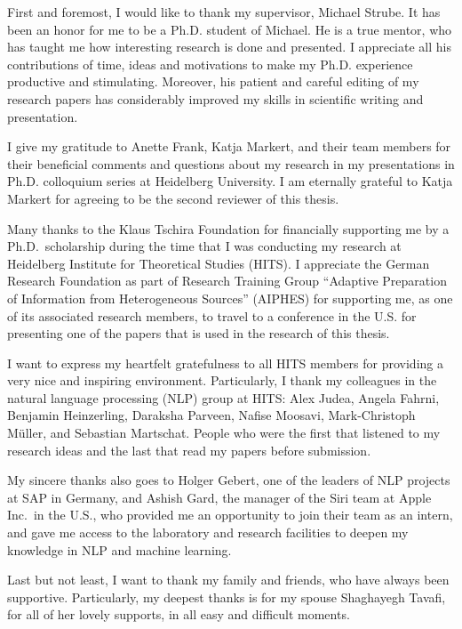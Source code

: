 
First and foremost, I would like to thank my supervisor, Michael Strube. 
It has been an honor for me to be a Ph.D. student of Michael. 
He is a true mentor, who has taught me how interesting research is done and presented. 
I appreciate all his contributions of time, ideas and motivations to make my Ph.D. experience productive and stimulating. 
Moreover, his patient and careful editing of my research papers has considerably improved my skills in scientific writing and presentation. 

I give my gratitude to Anette Frank, Katja Markert, and their team members for their beneficial comments and questions about my research in my presentations in Ph.D. colloquium series at Heidelberg University. 
I am eternally grateful to Katja Markert for agreeing to be the second reviewer of this thesis. 

Many thanks to the Klaus Tschira Foundation for financially supporting me by a Ph.D.\ scholarship during the time that I was conducting my research at Heidelberg Institute for Theoretical Studies (HITS). 
I appreciate the German Research Foundation as part of Research Training Group “Adaptive Preparation of Information from Heterogeneous Sources” (AIPHES) for supporting me, as one of its associated research members, to travel to a conference in the U.S. for presenting one of the papers that is used in the research of this thesis.  

I want to express my heartfelt gratefulness to all HITS members for providing a very nice and inspiring environment. 
Particularly, I thank my colleagues in the natural language processing (NLP) group at HITS:
Alex Judea, Angela Fahrni, Benjamin Heinzerling, Daraksha Parveen, Nafise Moosavi, \mbox{Mark-Christoph} M{\"u}ller, and Sebastian Martschat. 
People who were the first that listened to my research ideas and the last that read my papers before submission. 

My sincere thanks also goes to Holger Gebert, one of the leaders of NLP projects at SAP in Germany, and Ashish Gard, the manager of the Siri team at Apple Inc.\ in the U.S., who provided me an opportunity to join their team as an intern, and gave me access to the laboratory and research facilities to deepen my knowledge in NLP and machine learning. 

Last but not least, I want to thank my family and friends, who have always been supportive. 
Particularly, my deepest thanks is for my spouse Shaghayegh Tavafi, for all of her lovely supports, in all easy and difficult moments. 
